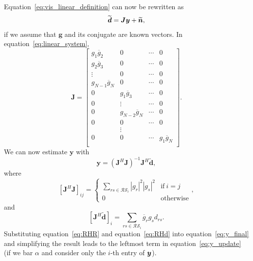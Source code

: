 \documentclass[useAMS,usenatbib]{mn2e}
\newcommand{\bn}{\bmath{n}}
\newcommand{\by}{\bmath{y}}
\newcommand{\conj}[1]{\overline{#1}}
\begin{document}
Equation~\ref{eq:vis_linear_definition} can now be rewritten as 
\begin{equation}
\label{eq:linear_system}
\widetilde{\boldsymbol{d}} = \boldsymbol{J}\boldsymbol{y} + \widetilde{\bn}, 
\end{equation}
if we assume that $\boldsymbol{g}$ and its conjugate are known vectors. In equation~\ref{eq:linear_system},
\begin{equation}
\boldsymbol{J} = 
\begin{bmatrix}
g_1\conj{g}_2 & 0 & \cdots & 0\\
g_2\conj{g}_3 & 0 & \cdots & 0\\
\vdots & 0 & \cdots & 0\\
g_{N-1}\conj{g}_N & 0 & \cdots & 0\\
0 & g_1\conj{g}_3 & \cdots & 0\\
0 & \vdots & \cdots & 0\\
0 & g_{N-2}\conj{g}_N & \cdots & 0\\
0 & 0 & \cdots & 0\\
  & \vdots & \\
0 & 0 & \cdots & g_1\conj{g}_N\\  
\end{bmatrix}.
\end{equation}
We can now estimate $\boldsymbol{y}$ with
\begin{equation}
\label{eq:y_final}
\boldsymbol{y} = (\boldsymbol{J}^H\boldsymbol{J})^{-1}\boldsymbol{J}^H\widetilde{\boldsymbol{d}}, 
\end{equation}
where 
\begin{equation}
\label{eq:RHR}
[\boldsymbol{J}^H\boldsymbol{J}]_{ij} = 
\begin{cases}
\sum_{rs\in\mathcal{RS}_i} |g_r|^2|g_s|^2 &\textrm{if}~i=j\\
0&\textrm{otherwise}
\end{cases},
\end{equation}
and
\begin{equation}
\label{eq:RHd}
[\boldsymbol{J}^H\widetilde{\boldsymbol{d}}]_i = \sum_{rs\in\mathcal{RS}_i} \conj{g}_r g_s d_{rs}. 
\end{equation}
Substituting equation~\ref{eq:RHR} and equation~\ref{eq:RHd} into equation~\ref{eq:y_final} and simplifying the result leads to the leftmost term in equation~\ref{eq:y_update} (if we bar $\alpha$ and consider 
only the $i$-th entry of $\by$).
\label{lastpage}
\end{document}
